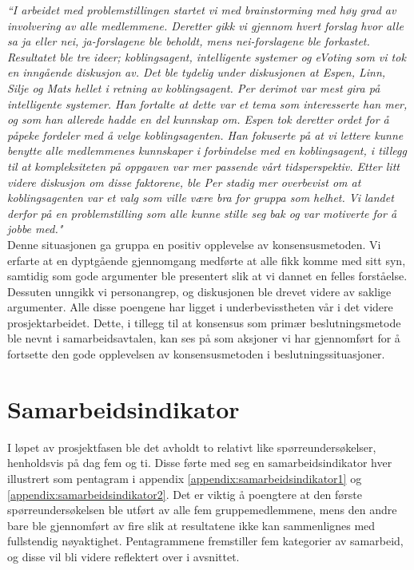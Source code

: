 \textit{``I arbeidet med problemstillingen startet vi med brainstorming med høy grad av involvering av alle medlemmene. Deretter gikk vi gjennom hvert forslag hvor alle sa ja eller nei, ja-forslagene ble beholdt, mens nei-forslagene ble forkastet. Resultatet ble tre ideer; koblingsagent, intelligente systemer og eVoting som vi tok en inngående diskusjon av. Det ble tydelig under diskusjonen at Espen, Linn, Silje og Mats hellet i retning av koblingsagent. Per derimot var mest gira på intelligente systemer. Han fortalte at dette var et tema som interesserte han mer, og som han allerede hadde en del kunnskap om. Espen tok deretter ordet for å påpeke fordeler med å velge koblingsagenten. Han fokuserte på at vi lettere kunne benytte alle medlemmenes kunnskaper i forbindelse med en koblingsagent, i tillegg til at kompleksiteten på oppgaven var mer passende vårt tidsperspektiv. Etter litt videre diskusjon om disse faktorene, ble Per stadig mer overbevist om at koblingsagenten var et valg som ville være bra for gruppa som helhet. Vi landet derfor på en problemstilling som alle kunne stille seg bak og var motiverte for å jobbe med."}\\

Denne situasjonen ga gruppa en positiv opplevelse av konsensusmetoden. Vi erfarte at en dyptgående gjennomgang medførte at alle fikk komme med sitt syn, samtidig som gode argumenter ble presentert slik at vi dannet en felles forståelse. Dessuten unngikk vi personangrep, og diskusjonen ble drevet videre av saklige argumenter. Alle disse poengene har ligget i underbevisstheten vår i det videre prosjektarbeidet. Dette, i tillegg til at konsensus som primær beslutningsmetode ble nevnt i samarbeidsavtalen, kan ses på som aksjoner vi har gjennomført for å fortsette den gode opplevelsen av konsensusmetoden i beslutningssituasjoner.\\


\section{Samarbeidsindikator}
\label{sec:samarbeidsindikator}
I løpet av prosjektfasen ble det avholdt to relativt like spørreundersøkelser, henholdsvis på dag fem og ti. Disse førte med seg en samarbeidsindikator hver illustrert som pentagram i appendix \ref{appendix:samarbeidsindikator1} og \ref{appendix:samarbeidsindikator2}. Det er viktig å poengtere at den første spørreundersøkelsen ble utført av alle fem gruppemedlemmene, mens den andre bare ble gjennomført av fire slik at resultatene ikke kan sammenlignes med fullstendig nøyaktighet. Pentagrammene fremstiller fem kategorier av samarbeid, og disse vil bli videre reflektert over i avsnittet.\\

